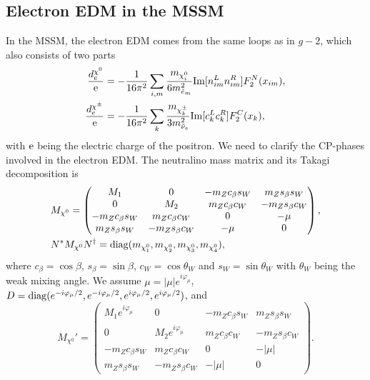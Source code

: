 \documentclass[a4paper,11pt]{article}
\begin{document}
   \subsection{Electron EDM in the MSSM}
   In the MSSM, the electron EDM comes from the same loops as in $g-2$, which also consists of two parts~\cite{Ibrahim:2007fb,Cheung:2009fc}
   \begin{align}\label{eq:electronEDM1}
	  \frac{d_{e}^{\chi^0}}{\rm e} &= - \frac{1}{16\pi^2} \sum_{i,m} \frac{m_{\chi^0_i}}{6 m^2_{\tilde e_m}} {\rm Im}[n^L_{im}n^R_{im}] F^N_2(x_{im}), \\
      \label{eq:electronEDM2}
      \frac{d_{e}^{\chi^\pm}}{\rm e} &= - \frac{1}{16\pi^2} \sum_{k} \frac{m_{\chi^\pm_k}}{3m^2_{\tilde\nu_e}} {\rm Im}[ c^L_kc^R_k] F^C_2(x_k),
   \end{align}
   with ${\rm e}$ being the electric charge of the positron. We need to clarify the CP-phases involved in the electron EDM. The neutralino mass matrix and its Takagi decomposition is
   \begin{align}
       & M_{\chi^0} = \begin{pmatrix}
          M_1 & 0 & -m_Z c_\beta s_W & m_Z s_\beta s_W\\
          0 & M_2 & m_Z c_\beta c_W & -m_Z s_\beta c_W \\
          -m_Z c_\beta s_W & m_Z c_\beta c_W & 0 & -\mu\\
          m_Z s_\beta s_W & -m_Z s_\beta c_W & -\mu & 0
       \end{pmatrix} ,\\
       & N^*M_{\chi^0}N^\dagger = {\rm diag}(m_{\chi^0_1},m_{\chi^0_2},m_{\chi^0_3},m_{\chi^0_4}),
   \end{align}
   where $c_\beta=\cos\beta$, $s_\beta=\sin\beta$, $c_W=\cos\theta_W$ and $s_W=\sin\theta_W$ with $\theta_W$ being the weak mixing angle. We assume $\mu=|\mu|e^{i\varphi_\mu}$, $D={\rm diag}(e^{-i\varphi_\mu/2},e^{-i\varphi_\mu/2},e^{i\varphi_\mu/2},e^{i\varphi_\mu/2})$, and
   \begin{equation}
       M_{\chi^0}' = \begin{pmatrix}
          M_1e^{i\varphi_\mu} & 0 & -m_Z c_\beta s_W & m_Z s_\beta s_W\\
          0 & M_2e^{i\varphi_\mu} & m_Z c_\beta c_W & -m_Z s_\beta c_W \\
          -m_Z c_\beta s_W & m_Z c_\beta c_W & 0 & -|\mu|\\
          m_Z s_\beta s_W & -m_Z s_\beta c_W & -|\mu| & 0
       \end{pmatrix}.
   \end{equation}
\end{document}
